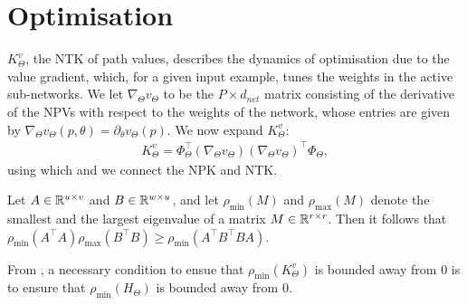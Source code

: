 \section{Optimisation}\label{sec:optimisation}
$K^v_{\Theta}$, the NTK of path values, describes the dynamics of optimisation due to the value gradient, which, for a given input example, tunes the weights in the active sub-networks. We let $\nabla_{\Theta}v_{\Theta}$ to be the $P\times d_{net}$ matrix consisting of the derivative of the NPVs with respect to the weights of the network, whose entries are given by $\nabla_{\Theta}v_{\Theta}(p,\theta)=\partial_{\theta}v_{\Theta}(p)$. We now expand $K^v_{\Theta}$:
\begin{align}\label{eq:kv}
K^{v}_{\Theta}=\Phi^\top_{\Theta}(\nabla_{\Theta} v_{\Theta})(\nabla_{\Theta} v_{\Theta})^\top \Phi_{\Theta},
\end{align}
using which and  we connect the NPK and NTK.
\begin{lemma}\label{lm:nec}
Let $A\in\mathbb{R}^{u\times v}$ and $B\in\mathbb{R}^{w\times u}$, and let $\rho_{\min}(M)$ and $\rho_{\max}(M)$ denote the smallest and the largest eigenvalue of a matrix $M\in\mathbb{R}^{r\times r}$. Then it follows that $\rho_{\min}(A^\top A)\rho_{\max}(B^\top B)\geq \rho_{\min}(A^\top B^\top BA)$.
\end{lemma}
From , a necessary condition to ensue that $\rho_{\min}(K^v_{\Theta})$ is bounded away from $0$ is to ensure that $\rho_{\min}(H_{\Theta})$ is bounded away from $0$.\\
